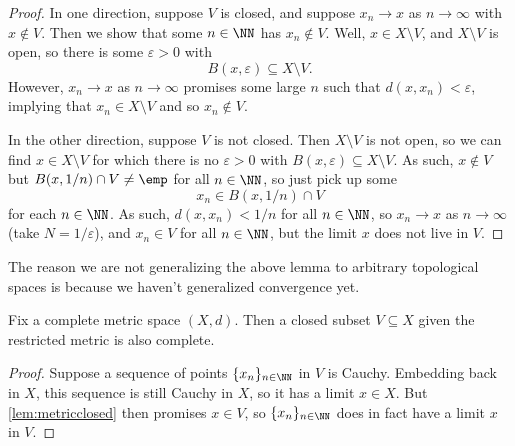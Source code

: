 \documentclass[../notes.tex]{subfiles}
\begin{document}
\begin{proof}
	In one direction, suppose $V$ is closed, and suppose $x_n\to x$ as $n\to\infty$ with $x\notin V$. Then we show that some $n\in\NN$ has $x_n\notin V$. Well, $x\in X\setminus V$, and $X\setminus V$ is open, so there is some $\varepsilon>0$ with
	\[B(x,\varepsilon)\subseteq X\setminus V.\]
	However, $x_n\to x$ as $n\to\infty$ promises some large $n$ such that $d(x,x_n)<\varepsilon$, implying that $x_n\in X\setminus V$ and so $x_n\notin V$.

	In the other direction, suppose $V$ is not closed. Then $X\setminus V$ is not open, so we can find $x\in X\setminus V$ for which there is no $\varepsilon>0$ with $B(x,\varepsilon)\subseteq X\setminus V$. As such, $x\notin V$ but $B(x,1/n)\cap V\ne\emp$ for all $n\in\NN$, so just pick up some
	\[x_n\in B(x,1/n)\cap V\]
	for each $n\in\NN$. As such, $d(x,x_n)<1/n$ for all $n\in\NN$, so $x_n\to x$ as $n\to\infty$ (take $N=1/\varepsilon$), and $x_n\in V$ for all $n\in\NN$, but the limit $x$ does not live in $V$.
\end{proof}
\begin{remark}
	The reason we are not generalizing the above lemma to arbitrary topological spaces is because we haven't generalized convergence yet.
\end{remark}
\begin{corollary} \label{cor:closediscomplete}
	Fix a complete metric space $(X,d)$. Then a closed subset $V\subseteq X$ given the restricted metric is also complete.
\end{corollary}
\begin{proof}
	Suppose a sequence of points $\{x_n\}_{n\in\NN}$ in $V$ is Cauchy. Embedding back in $X$, this sequence is still Cauchy in $X$, so it has a limit $x\in X$. But \autoref{lem:metricclosed} then promises $x\in V$, so $\{x_n\}_{n\in\NN}$ does in fact have a limit $x$ in $V$.
\end{proof}
\end{document}
